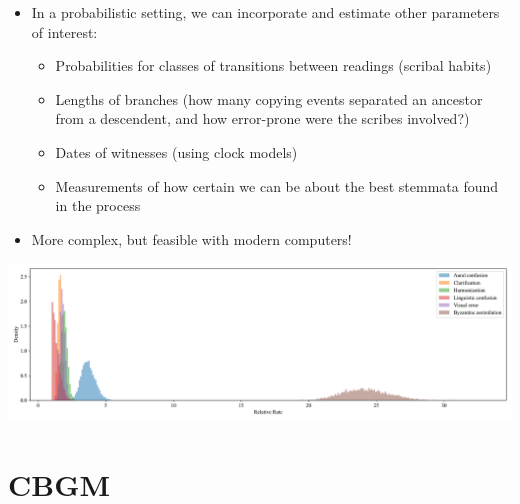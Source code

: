\documentclass[10pt]{beamer}
\begin{document}
	\begin{frame}
		\begin{itemize}
			\item In a probabilistic setting, we can incorporate and estimate other parameters of interest:
			\begin{itemize}
				\item Probabilities for classes of transitions between readings (scribal habits)
				\item Lengths of branches (how many copying events separated an ancestor from a descendent, and how error-prone were the scribes involved?)
				\item Dates of witnesses (using clock models)
				\item Measurements of how certain we can be about the best stemmata found in the process
			\end{itemize}
			\item More complex, but feasible with modern computers!
		\end{itemize}
		\begin{center}	
			\includegraphics[scale=0.25]{../img/ecm-mark-local-rates.pdf}
		\end{center}
	\end{frame}
	\section{CBGM}
	\sectionframe
\end{document}
